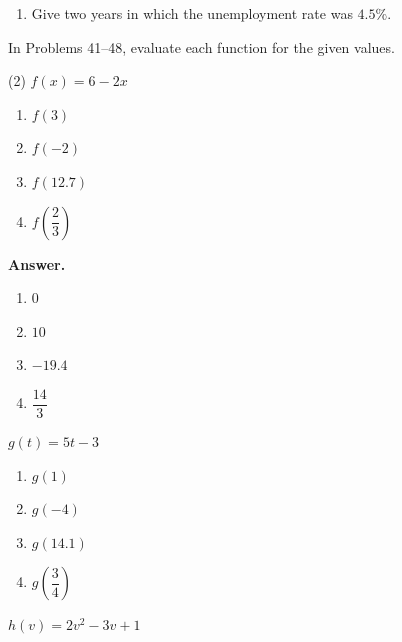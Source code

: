 \documentclass[10pt,]{book}
\theoremstyle{plain}
\theoremstyle{definition}
\theoremstyle{definition}
\theoremstyle{definition}
\theoremstyle{definition}
\numberwithin{equation}{part}
\begin{document}
\begin{exerciselist}
\begin{exercisegroup}
\begin{enumerate}[label=\alph*]
\item\hypertarget{li-404}{}Give two years in which the unemployment rate was \(4.5\%\).%
\end{enumerate}
%
\end{exercisegroup}
\par\smallskip\noindent
\hypertarget{exercisegroup-12}{}\par\noindent In Problems 41–48, evaluate each function for the given values.%
\begin{exercisegroup}(2)
\exercise[41.]\hypertarget{exercise-110}{}\(f (x) = 6 - 2x\) \leavevmode%
\begin{multicols}{2}
\begin{enumerate}[label=\alph*]
\item\hypertarget{li-405}{}\(f(3)\)%
\item\hypertarget{li-406}{}\(f(-2)\)%
\item\hypertarget{li-407}{}\(f(12.7)\)%
\item\hypertarget{li-408}{}\(f\left(\dfrac{2}{3}\right)\)%
\end{enumerate}
\end{multicols}
%
\par\smallskip
\noindent\textbf{Answer.}\hypertarget{answer-64}{}\quad
\leavevmode%
\begin{multicols}{2}
\begin{enumerate}[label=\alph*]
\item\hypertarget{li-409}{}\(0\)%
\item\hypertarget{li-410}{}\(10\)%
\item\hypertarget{li-411}{}\(-19.4\)%
\item\hypertarget{li-412}{}\(\dfrac{14}{3} \)%
\end{enumerate}
\end{multicols}
%
\exercise[42.]\hypertarget{exercise-111}{}\(g(t) = 5t - 3\) \leavevmode%
\begin{multicols}{2}
\begin{enumerate}[label=\alph*]
\item\hypertarget{li-413}{}\(g(1)\)%
\item\hypertarget{li-414}{}\(g(-4)\)%
\item\hypertarget{li-415}{}\(g(14.1)\)%
\item\hypertarget{li-416}{}\(g\left(\dfrac{3}{4}\right)\)%
\end{enumerate}
\end{multicols}
%
\exercise[43.]\hypertarget{exercise-112}{}\(h(v) = 2v^2 - 3v + 1\) \leavevmode%

\end{exercisegroup}
\end{exerciselist}
\end{document}

